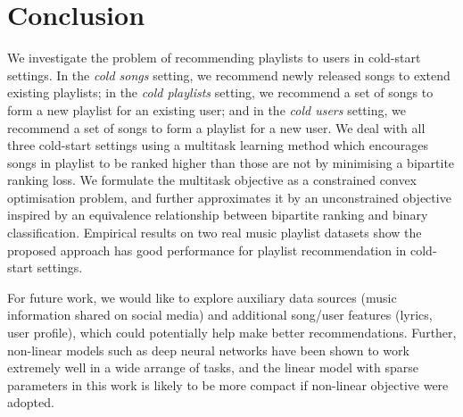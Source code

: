 \section{Conclusion}

We investigate the problem of recommending playlists to users in cold-start settings.
In the {\it cold songs} setting, we recommend newly released songs to extend existing playlists;
in the {\it cold playlists} setting, we recommend a set of songs to form a new playlist for an existing user;
and in the {\it cold users} setting, we recommend a set of songs to form a playlist for a new user.
We deal with all three cold-start settings using a multitask learning method which encourages songs in playlist 
to be ranked higher than those are not by minimising a bipartite ranking loss. 
We formulate the multitask objective as a constrained convex optimisation problem, and further approximates it 
by an unconstrained objective inspired by an equivalence relationship between bipartite ranking and binary classification. 
Empirical results on two real music playlist datasets show the proposed approach 
has good performance for playlist recommendation in cold-start settings.

For future work, we would like to explore 
auxiliary data sources (\eg music information shared on social media) and additional song/user 
features (\eg lyrics, user profile), %
which could potentially help make better recommendations.
Further, non-linear models such as deep neural networks have been shown to work extremely well in a wide arrange of tasks,
and the linear model with sparse parameters in this work is likely to be more compact if non-linear objective were adopted.

